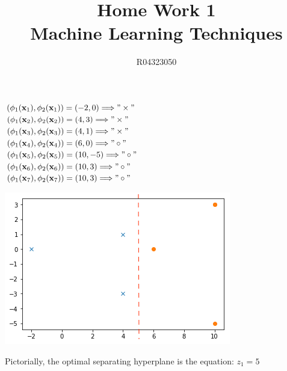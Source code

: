 \documentclass[fleqn,a4paper,12pt]{article}
\title{Home Work 1\\ Machine Learning Techniques}
\author{R04323050 \\{\McQ\cH37}\z{\MbQ\cH200}\z{\MmQ\cH238}\z{\McQ\cH250}   \quad {\McQ\cH207}\z{\MdQ\cH43}\z{\MjQ\cH254}}
\date{}
\begin{document}
\maketitle

\section{}
  \begin{minipage}{\linewidth}
      \begin{minipage}{0.4\linewidth}
\raggedright
   $(\phi_{1}(\bold x_{1}), \phi_{2}(\bold x_{1}))=(-2,0) \Longrightarrow "\times"$ \\
   $(\phi_{1}(\bold x_{2}), \phi_{2}(\bold x_{2}))=(4,3) \Longrightarrow "\times"$ \\
   $(\phi_{1}(\bold x_{3}), \phi_{2}(\bold x_{3}))=(4,1) \Longrightarrow "\times"$ \\
   $(\phi_{1}(\bold x_{4}), \phi_{2}(\bold x_{4}))=(6,0) \Longrightarrow "\circ"$ \\
   $(\phi_{1}(\bold x_{5}), \phi_{2}(\bold x_{5}))=(10,-5) \Longrightarrow "\circ"$ \\
   $(\phi_{1}(\bold x_{6}), \phi_{2}(\bold x_{6}))=(10,3) \Longrightarrow "\circ"$ \\
   $(\phi_{1}(\bold x_{7}), \phi_{2}(\bold x_{7}))=(10,3) \Longrightarrow "\circ"$ \\
     
   \end{minipage}
      \hspace{0.05\linewidth}
      \begin{minipage}{0.6\linewidth}
 
      \includegraphics[scale=0.7]{Q1.png}
      \end{minipage}
  \end{minipage}
Pictorially, the optimal separating hyperplane is the equation: $z_{1}=5${\MaQ{}}\zZ
\end{document}
